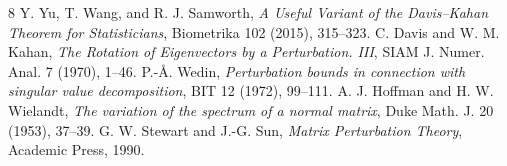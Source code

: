 \begin{thebibliography}{8}
 Y. Yu, T. Wang, and R. J. Samworth, \emph{A Useful Variant of the Davis--Kahan Theorem for Statisticians}, Biometrika 102 (2015), 315--323.
 C. Davis and W. M. Kahan, \emph{The Rotation of Eigenvectors by a Perturbation. III}, SIAM J. Numer. Anal. 7 (1970), 1--46.
 P.-\AA. Wedin, \emph{Perturbation bounds in connection with singular value decomposition}, BIT 12 (1972), 99--111.
 A. J. Hoffman and H. W. Wielandt, \emph{The variation of the spectrum of a normal matrix}, Duke Math. J. 20 (1953), 37--39.
 G. W. Stewart and J.-G. Sun, \emph{Matrix Perturbation Theory}, Academic Press, 1990.
\end{thebibliography}



